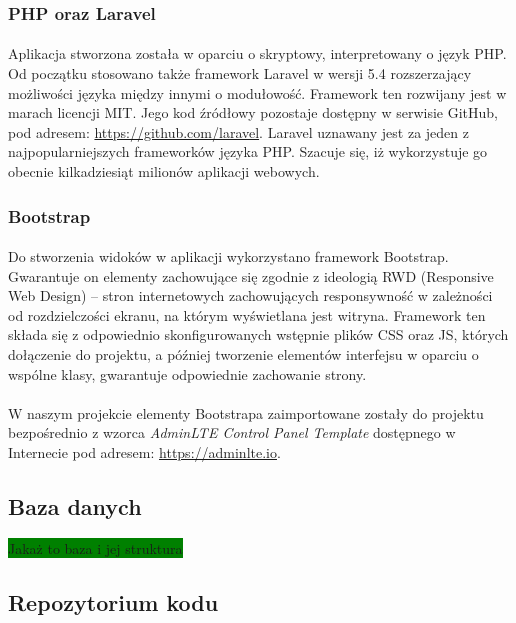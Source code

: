 \documentclass[a4paper, 12pt, oneside]{article}
\begin{document}
			\subsubsection{PHP oraz Laravel}
				\paragraph{} Aplikacja stworzona została w oparciu o skryptowy, interpretowany o język PHP. Od początku stosowano także framework Laravel w wersji 5.4 rozszerzający możliwości języka między innymi o modułowość. Framework ten rozwijany jest w marach licencji MIT. Jego kod źródłowy pozostaje dostępny w serwisie GitHub, pod adresem: \url{https://github.com/laravel}. Laravel uznawany jest za jeden z najpopularniejszych frameworków języka PHP. Szacuje się, iż wykorzystuje go obecnie kilkadziesiąt milionów aplikacji webowych.
			\subsubsection{Bootstrap}
				\paragraph{} Do stworzenia widoków w aplikacji wykorzystano framework Bootstrap. Gwarantuje on elementy zachowujące się zgodnie z ideologią RWD (Responsive Web Design) -- stron internetowych zachowujących responsywność w zależności od rozdzielczości ekranu, na którym wyświetlana jest witryna. Framework ten składa się z odpowiednio skonfigurowanych wstępnie plików CSS oraz JS, których dołączenie do projektu, a później tworzenie elementów interfejsu w oparciu o wspólne klasy, gwarantuje odpowiednie zachowanie strony.
				\paragraph{} W naszym projekcie elementy Bootstrapa zaimportowane zostały do projektu bezpośrednio z wzorca \textit{AdminLTE Control Panel Template} dostępnego w Internecie pod adresem: \url{https://adminlte.io}.  
				
		\subsection{Baza danych}
			\colorbox{green}{Jakaż to baza i jej struktura}
		\subsection{Repozytorium kodu}
\end{document}
